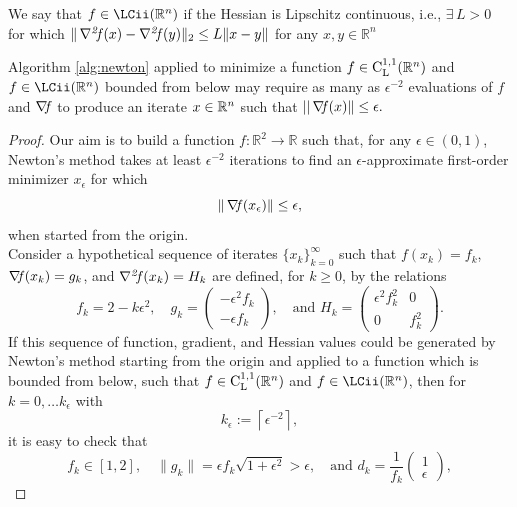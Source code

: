 \documentclass[10pt,a4paper]{article}
\begin{document}
\begin{definition}
	We say that $f\in \LCii(\Rn)$ if the Hessian is Lipschitz continuous, i.e., $ \exists\, L > 0$ for which $\|\operatorname*{\mathit{\nabla^2 \!f}}(x) - \operatorname*{\mathit{\nabla^2 \!f}}(y)\|_2 \leq L\|x - y\|$ for any $x, y \in \mathbb{R}^n$
\end{definition}
\begin{theorem}\label{thm:slow_newton}
	Algorithm \ref{alg:newton} applied to minimize a function $f\in \mathord{\mathrm{C^{1,1}_{L}}}(\mathbb{R}^n)$ and $f\in \LCii(\Rn)$ bounded from below may require as many as $\epsilon^{-2}$ evaluations of $f$ and $\operatorname*{\mathit{\nabla \!f}}$ to produce an iterate $x\in \mathbb{R}^n$ such that $||\operatorname*{\mathit{\nabla \!f}} (x)\|\leq \epsilon.$
\end{theorem}
\begin{proof}
	Our aim is to build a function $f : \mathbb{R}^2 \to \mathbb{R}$ such that, for any $\epsilon \in (0,1)$, Newton's method takes at least $\epsilon^{-2}$ iterations to find an $\epsilon$-approximate first-order minimizer $x_\epsilon$ for which
	\begin{equation*}
		\|\operatorname*{\mathit{\nabla \!f}}(x_\epsilon)\| \leq \epsilon,
	\end{equation*}
	when started from the origin.\\
	Consider a hypothetical sequence of iterates $\{x_k\}_{k=0}^\infty$ such that $f(x_k) = f_k$, $\operatorname*{\mathit{\nabla \!f}}(x_k) = g_k$, and $\operatorname*{\mathit{\nabla^2 \!f}}(x_k) = H_k$ are defined, for $k \geq 0$, by the relations
	\begin{equation}\label{eq:def_fk}
		f_k = 2 - k\epsilon^2, \quad g_k = \begin{pmatrix} -\epsilon^2 f_k \\ -\epsilon f_k \end{pmatrix}, \quad \text{and } H_k = \begin{pmatrix} \epsilon^2 f_k^2 & 0 \\ 0 & f_k^2 \end{pmatrix}.
	\end{equation}
	If this sequence of function, gradient, and Hessian values could be generated by Newton's method starting from the origin and applied to a function which is bounded from below, such that $f\in \mathord{\mathrm{C^{1,1}_{L}}}(\mathbb{R}^n)$ and $f\in \LCii(\Rn)$, then for $k=0,\dots k_\epsilon$ with
	\begin{equation*}
		k_\epsilon := \left\lceil \epsilon^{-2} \right\rceil,
	\end{equation*}
	it is easy to check that
	\begin{equation*}
		f_k \in [1,2], \quad \|g_k\| = \epsilon f_k \sqrt{1 + \epsilon^2} > \epsilon, \quad \text{and } d_k = \frac{1}{f_k} \begin{pmatrix} 1 \\ \epsilon \end{pmatrix},

\end{equation*}
\end{proof}
\end{document}
